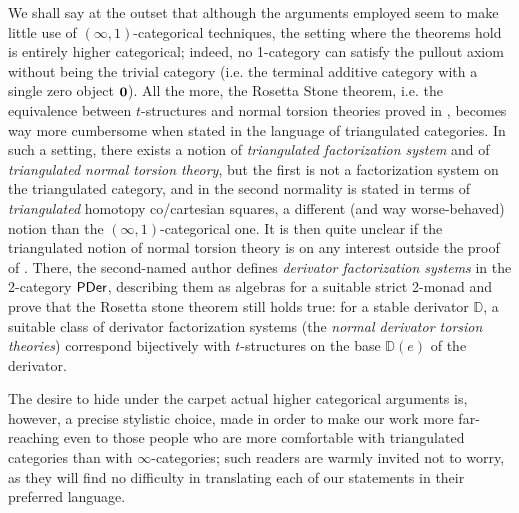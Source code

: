 {We shall say at the outset that although the arguments employed seem to make little use of $(\infty,1)$-categorical techniques, the setting where the theorems hold is entirely higher categorical; indeed, no 1-category can satisfy the pullout axiom without being the trivial category (i.e. the terminal additive category with a single zero object $\bf 0$). All the more, the Rosetta Stone theorem, i.e. the equivalence between $t$-structures and normal torsion theories proved in \cite{Fiorenza2014}, becomes way more cumbersome when stated in the language of triangulated categories. In such a setting, there exists a notion of \emph{triangulated factorization system} and of \emph{triangulated normal torsion theory}, but the first is not a factorization system on the triangulated category, and in the second normality is stated in terms of \emph{triangulated} homotopy co/cartesian squares, a different (and way worse-behaved) notion than the $(\infty,1)$-categorical one. It is then quite unclear if the triangulated notion of normal torsion theory is on any interest outside the proof of \cite[2.11]{tderiv}. There, the second-named author defines \emph{derivator factorization systems} in the 2-category $\sf PDer$, describing them as algebras for a suitable strict 2-monad and prove that the Rosetta stone theorem still holds true: for a stable derivator $\mathbb D$, a suitable class of derivator factorization systems (the \emph{normal derivator torsion theories}) correspond bijectively with $t$-structures on the base $\mathbb D(e)$ of the derivator.

The desire to hide under the carpet actual higher categorical arguments is, however, a precise stylistic choice, made in order to make our work more far-reaching even to those people who are more comfortable with triangulated categories than with $\infty$-categories; such readers are warmly invited not to worry, as they will find no difficulty in translating  each of our statements in their preferred language.
}